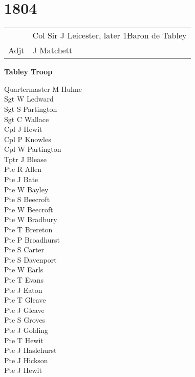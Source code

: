 \chapter*{1804}

\begin{center}
  \begin{tabular}{rl}
    & Col Sir J Leicester, later 1\st Baron de Tabley \\
    Adjt & J Matchett \\
  \end{tabular}
\end{center}

\begin{center}
  \Large
  \textbf{Tabley Troop}
\end{center}

\begin{multicols}{2}
  \noindent
  Quartermaster M Hulme \\
  Sgt W Ledward \\
  Sgt S Partington \\
  Sgt C Wallace \\
  Cpl J Hewit \\
  Cpl P Knowles \\
  Cpl W Partington \\
  Tptr J Blease \\
  Pte R Allen \\
  Pte J Bate \\
  Pte W Bayley \\
  Pte S Beecroft \\
  Pte W Beecroft \\
  Pte W Bradbury \\
  Pte T Brereton \\
  Pte P Broadhurst \\
  Pte S Carter \\
  Pte S Davenport \\
  Pte W Earls \\
  Pte T Evans \\
  Pte J Eaton \\
  Pte T Gleave \\
  Pte J Gleave \\
  Pte S Groves \\
  Pte J Golding \\
  Pte T Hewit \\
  Pte J Haslehurst \\
  Pte J Hickson \\
  Pte J Hewit \\

\end{multicols}
